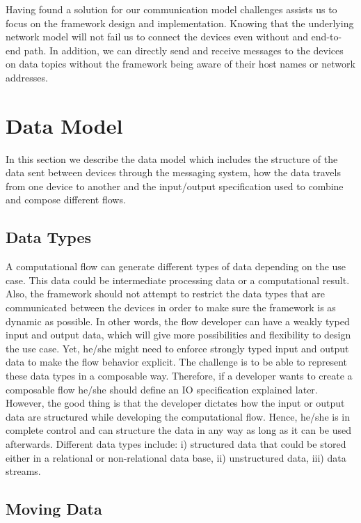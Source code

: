 \noindent Having found a solution for our communication model challenges assists us to focus on the framework design and implementation. Knowing that the underlying network model will not fail us to connect the devices even without and end-to-end path. In addition, we can directly send and receive messages to the devices on data topics without the framework being aware of their host names or network addresses.  




\section{Data Model}
In this section we describe the data model which includes the structure of the data sent between devices through the messaging system, how the data travels from one device to another and the input/output specification used to combine and compose different flows.

\subsection{Data Types}
A computational flow can generate different types of data depending on the use case. This data could be intermediate processing data or a computational result. Also, the framework should not attempt to restrict the data types that are communicated between the devices in order to make sure the framework is as dynamic as possible. In other words, the flow developer can have a weakly typed input and output data, which will give more possibilities and flexibility to design the use case. Yet, he/she might need to enforce strongly typed input and output data to  make the flow behavior explicit. The challenge is to be able to represent these data types in a composable way. Therefore, if a developer wants to create a composable flow he/she should define an IO specification explained later. However, the good thing is that the developer dictates how the input or output data are structured while developing the computational flow. Hence, he/she is in complete control and can structure the data in any way as long as it can be used afterwards.  Different data types include: i) structured data that could be stored either in a relational or non-relational data base, ii) unstructured data, iii)  data streams.

\subsection{Moving Data}

